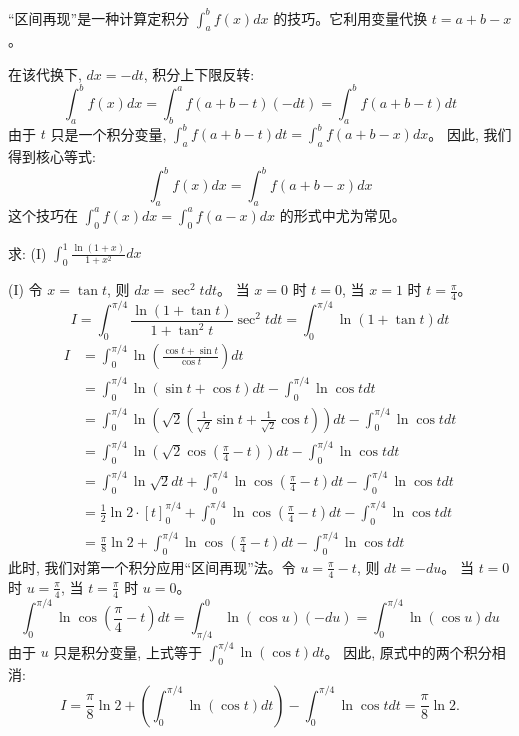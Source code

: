 \documentclass[lang=cn,newtx,10pt,scheme=chinese]{elegantbook}
\renewcommand{\textbf}[1]{\text{\heiti #1}}
\begin{document}
    “区间再现”是一种计算定积分 $\int_a^b f(x) dx$ 的技巧。它利用变量代换 $t = a + b - x$。

在该代换下, $dx = -dt$, 积分上下限反转:
$$
\int_a^b f(x) dx = \int_b^a f(a + b - t) (-dt) = \int_a^b f(a + b - t) dt
$$
由于 $t$ 只是一个积分变量, $\int_a^b f(a + b - t) dt = \int_a^b f(a + b - x) dx$。
因此, 我们得到核心等式:
$$
\int_a^b f(x) dx = \int_a^b f(a + b - x) dx
$$
这个技巧在 $\int_0^a f(x) dx = \int_0^a f(a - x) dx$ 的形式中尤为常见。

\begin{example}[3.37 (I)]
求: (I) $\int_0^1 \frac{\ln(1 + x)}{1 + x^2} dx$
\end{example}

\begin{solution}
(I) 令 $x = \tan t$, 则 $dx = \sec^2 t dt$。
当 $x=0$ 时 $t=0$, 当 $x=1$ 时 $t=\frac{\pi}{4}$。
$$
I = \int_0^{\pi/4} \frac{\ln(1 + \tan t)}{1 + \tan^2 t} \sec^2 t dt = \int_0^{\pi/4} \ln(1 + \tan t) dt
$$
\textbf{方法一：(课本解法)}
$$
\begin{aligned}
I &= \int_0^{\pi/4} \ln\left( \frac{\cos t + \sin t}{\cos t} \right) dt \\
&= \int_0^{\pi/4} \ln(\sin t + \cos t) dt - \int_0^{\pi/4} \ln \cos t dt \text{} \\
&= \int_0^{\pi/4} \ln\left(\sqrt{2} \left( \frac{1}{\sqrt{2}}\sin t + \frac{1}{\sqrt{2}}\cos t \right) \right) dt - \int_0^{\pi/4} \ln \cos t dt \\
&= \int_0^{\pi/4} \ln\left(\sqrt{2} \cos\left(\frac{\pi}{4} - t\right)\right) dt - \int_0^{\pi/4} \ln \cos t dt \text{} \\
&= \int_0^{\pi/4} \ln \sqrt{2} dt + \int_0^{\pi/4} \ln \cos\left(\frac{\pi}{4} - t\right) dt - \int_0^{\pi/4} \ln \cos t dt \\
&= \frac{1}{2}\ln 2 \cdot [t]_0^{\pi/4} + \int_0^{\pi/4} \ln \cos\left(\frac{\pi}{4} - t\right) dt - \int_0^{\pi/4} \ln \cos t dt \\
&= \frac{\pi}{8} \ln 2 + \int_0^{\pi/4} \ln \cos\left(\frac{\pi}{4} - t\right) dt - \int_0^{\pi/4} \ln \cos t dt \text{}
\end{aligned}
$$
此时, 我们对第一个积分应用“区间再现”法。令 $u = \frac{\pi}{4} - t$, 则 $dt = -du$。
当 $t=0$ 时 $u=\frac{\pi}{4}$, 当 $t=\frac{\pi}{4}$ 时 $u=0$。
$$
\int_0^{\pi/4} \ln \cos\left(\frac{\pi}{4} - t\right) dt = \int_{\pi/4}^0 \ln(\cos u) (-du) = \int_0^{\pi/4} \ln(\cos u) du
$$
由于 $u$ 只是积分变量, 上式等于 $\int_0^{\pi/4} \ln(\cos t) dt$。
因此, 原式中的两个积分相消:
$$
I = \frac{\pi}{8} \ln 2 + \left( \int_0^{\pi/4} \ln(\cos t) dt \right) - \int_0^{\pi/4} \ln \cos t dt = \frac{\pi}{8} \ln 2. \text{}
$$
\end{solution}
\end{document}
